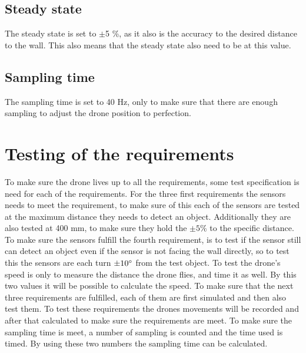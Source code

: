 \subsection*{Steady state}
The steady state is set to  $\pm$5 \%, as it also is the accuracy to the desired distance to the wall. This also means that the steady state also need to be at this value. 

\subsection*{Sampling time}
The sampling time is set to 40 Hz, only to make sure that there are enough sampling to adjust the drone position to perfection. 

\section{Testing of the requirements}\label{s:test_requirements}
To make sure the drone lives up to all the requirements, some test specification is need for each of the requirements.
For the three first requirements the sensors needs to meet the requirement, to make sure of this each of the sensors are tested at the maximum distance they needs to detect an object. Additionally they are also tested at 400 mm, to make sure they hold the $\pm5 \%$ to the specific distance. 
\newline
To make sure the sensors fulfill the fourth requirement, is to test if the sensor still can detect an object even if the sensor is not facing the wall directly, so to test this the sensors are each turn $\pm10\degree$ from the test object.
\newline
To test the drone's speed is only to measure the distance the drone flies, and time it as well. By this two values it will be possible to calculate the speed. 
\newline
To make sure that the next three requirements are fulfilled, each of them are first simulated and then also test them. To test these requirements the drones movements will be recorded and after that calculated to make sure the requirements are meet. 
\newline
To make sure the sampling time is meet, a number of sampling is counted and the time used is timed. By using 
these two numbers the sampling time can be calculated. 


